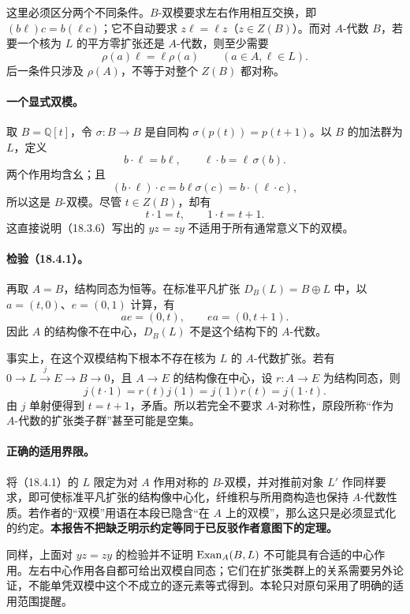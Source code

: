 这里必须区分两个不同条件。$B$-双模要求左右作用相互交换，即 $(b\ell)c=b(\ell c)$；它不自动要求 $z\ell=\ell z$（$z\in Z(B)$）。而对 $A$-代数 $B$，若要一个核为 $L$ 的平方零扩张还是 $A$-代数，则至少需要
\[
 \rho(a)\ell=\ell\rho(a)\qquad(a\in A,\ell\in L).
\]
后一条件只涉及 $\rho(A)$，不等于对整个 $Z(B)$ 都对称。

\paragraph{一个显式双模。}
取 $B=\mathbb Q[t]$，令 $\sigma:B\to B$ 是自同构 $\sigma(p(t))=p(t+1)$。以 $B$ 的加法群为 $L$，定义
\[
 b\cdot\ell=b\ell,\qquad \ell\cdot b=\ell\,\sigma(b).
\]
两个作用均含幺；且
\[
 (b\cdot\ell)\cdot c=b\ell\sigma(c)
 =b\cdot(\ell\cdot c),
\]
所以这是 $B$-双模。尽管 $t\in Z(B)$，却有
\[
 t\cdot1=t,\qquad1\cdot t=t+1.
\]
这直接说明（18.3.6）写出的 $yz=zy$ 不适用于所有通常意义下的双模。

\paragraph{检验（18.4.1）。}
再取 $A=B$，结构同态为恒等。在标准平凡扩张 $D_B(L)=B\oplus L$ 中，以 $a=(t,0)$、$e=(0,1)$ 计算，有
\[
 ae=(0,t),\qquad ea=(0,t+1).
\]
因此 $A$ 的结构像不在中心，$D_B(L)$ 不是这个结构下的 $A$-代数。

事实上，在这个双模结构下根本不存在核为 $L$ 的 $A$-代数扩张。若有 $0\to L\xrightarrow{j}E\to B\to0$，且 $A\to E$ 的结构像在中心，设 $r:A\to E$ 为结构同态，则
\[
 j(t\cdot1)=r(t)j(1)=j(1)r(t)=j(1\cdot t).
\]
由 $j$ 单射便得到 $t=t+1$，矛盾。所以若完全不要求 $A$-对称性，原段所称“作为 $A$-代数的扩张类子群”甚至可能是空集。

\paragraph{正确的适用界限。}
将（18.4.1）的 $L$ 限定为对 $A$ 作用对称的 $B$-双模，并对推前对象 $L'$ 作同样要求，即可使标准平凡扩张的结构像中心化，纤维积与所用商构造也保持 $A$-代数性质。若作者的“双模”用语在本段已隐含“在 $A$ 上的双模”，那么这只是必须显式化的约定。\textbf{本报告不把缺乏明示约定等同于已反驳作者意图下的定理。}

同样，上面对 $yz=zy$ 的检验并不证明 $\operatorname{Exan}_A(B,L)$ 不可能具有合适的中心作用。左右中心作用各自都可给出双模自同态；它们在扩张类群上的关系需要另外论证，不能单凭双模中这个不成立的逐元素等式得到。本轮只对原句采用了明确的适用范围提醒。

